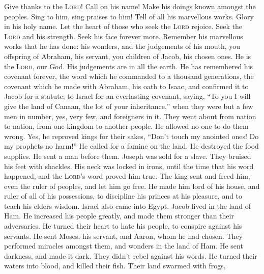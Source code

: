  Give thanks to the \textsc{Lord}! Call on his name! Make
his doings known amongst the peoples.  Sing to him, sing
praises to him! Tell of all his marvellous works.  Glory
in his holy name. Let the heart of those who seek the \textsc{Lord}
rejoice.  Seek the \textsc{Lord} and his strength. Seek
his face forever more.  Remember his marvellous works that
he has done: his wonders, and the judgements of his mouth,
 you offspring of Abraham, his servant, you children of
Jacob, his chosen ones.  He is the \textsc{Lord}, our God.
His judgements are in all the earth.  He has remembered
his covenant forever, the word which he commanded to a thousand
generations,  the covenant which he made with Abraham, his
oath to Isaac,  and confirmed it to Jacob for a statute;
to Israel for an everlasting covenant,  saying, ``To you
I will give the land of Canaan, the lot of your inheritance,''
 when they were but a few men in number, yes, very few,
and foreigners in it.  They went about from nation to
nation, from one kingdom to another people.  He allowed
no one to do them wrong. Yes, he reproved kings for their sakes,
 ``Don't touch my anointed ones! Do my prophets no
harm!''  He called for a famine on the land. He destroyed
the food supplies.  He sent a man before them. Joseph was
sold for a slave.  They bruised his feet with shackles.
His neck was locked in irons,  until the time that his
word happened, and the \textsc{Lord}'s word proved him true.
 The king sent and freed him, even the ruler of peoples,
and let him go free.  He made him lord of his house, and
ruler of all of his possessions,  to discipline his
princes at his pleasure, and to teach his elders wisdom. 
Israel also came into Egypt. Jacob lived in the land of Ham.
 He increased his people greatly, and made them stronger
than their adversaries.  He turned their heart to hate
his people, to conspire against his servants.  He sent
Moses, his servant, and Aaron, whom he had chosen.  They
performed miracles amongst them, and wonders in the land of Ham.
 He sent darkness, and made it dark. They didn't rebel
against his words.  He turned their waters into blood,
and killed their fish.  Their land swarmed with frogs,
